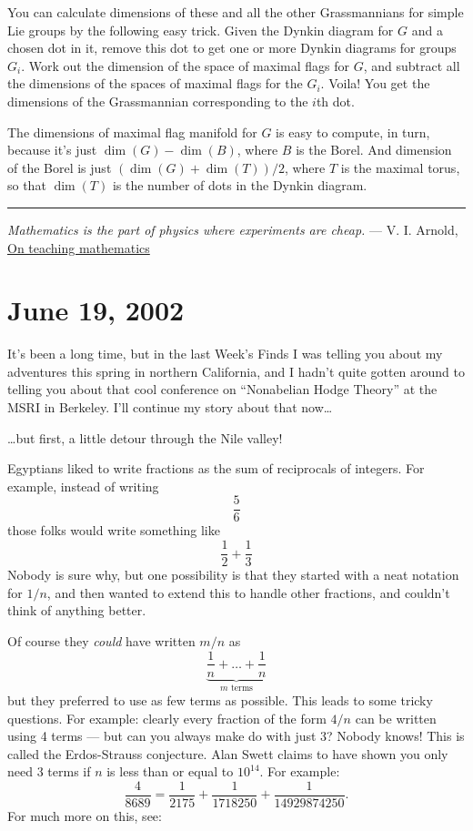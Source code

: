 \documentclass{article}
\begin{document}
You can calculate dimensions of these and all the other Grassmannians
for simple Lie groups by the following easy trick. Given the Dynkin
diagram for \(G\) and a chosen dot in it, remove this dot to get one or
more Dynkin diagrams for groups \(G_i\). Work out the dimension of the
space of maximal flags for \(G\), and subtract all the dimensions of the
spaces of maximal flags for the \(G_i\). Voila! You get the dimensions
of the Grassmannian corresponding to the \(i\)th dot.

The dimensions of maximal flag manifold for \(G\) is easy to compute, in
turn, because it's just \(\dim(G) - \dim(B)\), where \(B\) is the Borel.
And dimension of the Borel is just \((\dim(G) + \dim(T))/2\), where
\(T\) is the maximal torus, so that \(\dim(T)\) is the number of dots in
the Dynkin diagram.

\begin{center}\rule{0.5\linewidth}{0.5pt}\end{center}

\emph{Mathematics is the part of physics where experiments are cheap.}
--- V. I. Arnold,
\href{http://pauli.uni-muenster.de/~munsteg/arnold.html}{On teaching
mathematics}



\hypertarget{week182}{%
\section{June 19, 2002}\label{week182}}

It's been a long time, but in the last Week's Finds I was telling you
about my adventures this spring in northern California, and I hadn't
quite gotten around to telling you about that cool conference on
``Nonabelian Hodge Theory'' at the MSRI in Berkeley. I'll continue my
story about that now\ldots{}

\ldots but first, a little detour through the Nile valley!

Egyptians liked to write fractions as the sum of reciprocals of
integers. For example, instead of writing \[\frac56\] those folks would
write something like \[\frac12 + \frac13\] Nobody is sure why, but one
possibility is that they started with a neat notation for \(1/n\), and
then wanted to extend this to handle other fractions, and couldn't think
of anything better.

Of course they \emph{could} have written \(m/n\) as
\[\underbrace{\frac1n+\ldots+\frac1n}_{\mbox{$m$ terms}}\] but they
preferred to use as few terms as possible. This leads to some tricky
questions. For example: clearly every fraction of the form \(4/n\) can
be written using 4 terms --- but can you always make do with just 3?
Nobody knows! This is called the Erdos-Strauss conjecture. Alan Swett
claims to have shown you only need 3 terms if \(n\) is less than or
equal to \(10^{14}\). For example:
\[\frac{4}{8689} = \frac{1}{2175} + \frac{1}{1718250} + \frac{1}{14929874250}.\]
For much more on this, see:
\end{document}
